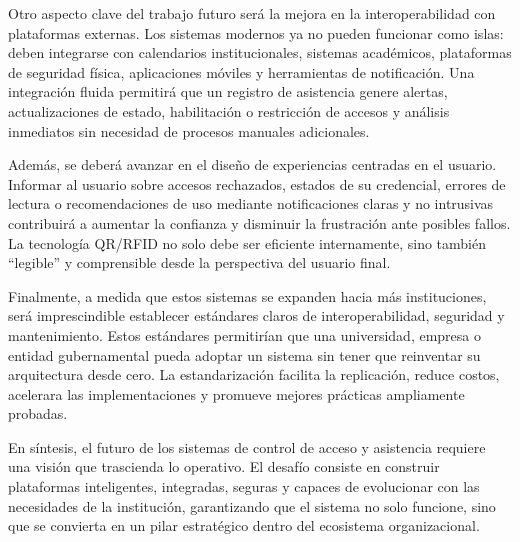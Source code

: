 Otro aspecto clave del trabajo futuro será la mejora en la interoperabilidad con plataformas externas. Los sistemas modernos ya no pueden funcionar como islas: deben integrarse con calendarios institucionales, sistemas académicos, plataformas de seguridad física, aplicaciones móviles y herramientas de notificación. Una integración fluida permitirá que un registro de asistencia genere alertas, actualizaciones de estado, habilitación o restricción de accesos y análisis inmediatos sin necesidad de procesos manuales adicionales.

Además, se deberá avanzar en el diseño de experiencias centradas en el usuario. Informar al usuario sobre accesos rechazados, estados de su credencial, errores de lectura o recomendaciones de uso mediante notificaciones claras y no intrusivas contribuirá a aumentar la confianza y disminuir la frustración ante posibles fallos. La tecnología QR/RFID no solo debe ser eficiente internamente, sino también “legible” y comprensible desde la perspectiva del usuario final.

Finalmente, a medida que estos sistemas se expanden hacia más instituciones, será imprescindible establecer estándares claros de interoperabilidad, seguridad y mantenimiento. Estos estándares permitirían que una universidad, empresa o entidad gubernamental pueda adoptar un sistema sin tener que reinventar su arquitectura desde cero. La estandarización facilita la replicación, reduce costos, acelerara las implementaciones y promueve mejores prácticas ampliamente probadas.

En síntesis, el futuro de los sistemas de control de acceso y asistencia requiere una visión que trascienda lo operativo. El desafío consiste en construir plataformas inteligentes, integradas, seguras y capaces de evolucionar con las necesidades de la institución, garantizando que el sistema no solo funcione, sino que se convierta en un pilar estratégico dentro del ecosistema organizacional.


